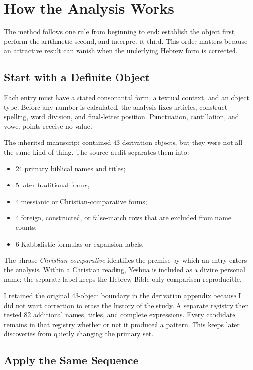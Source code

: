 \section{How the Analysis Works}

The method follows one rule from beginning to end: establish the object first, perform the arithmetic second, and interpret it third. This order matters because an attractive result can vanish when the underlying Hebrew form is corrected.

\subsection{Start with a Definite Object}

Each entry must have a stated consonantal form, a textual context, and an object type. Before any number is calculated, the analysis fixes articles, construct spelling, word division, and final-letter position. Punctuation, cantillation, and vowel points receive no value.

The inherited manuscript contained 43 derivation objects, but they were not all the same kind of thing. The source audit separates them into:

\begin{itemize}
\item 24 primary biblical names and titles;
\item 5 later traditional forms;
\item 4 messianic or Christian-comparative forms;
\item 4 foreign, constructed, or false-match rows that are excluded from name counts;
\item 6 Kabbalistic formulas or expansion labels.
\end{itemize}

The phrase \emph{Christian-comparative} identifies the premise by which an entry enters the analysis. Within a Christian reading, Yeshua is included as a divine personal name; the separate label keeps the Hebrew-Bible-only comparison reproducible.

I retained the original 43-object boundary in the derivation appendix because I did not want correction to erase the history of the study. A separate registry then tested 82 additional names, titles, and complete expressions. Every candidate remains in that registry whether or not it produced a pattern. This keeps later discoveries from quietly changing the primary set.

\subsection{Apply the Same Sequence}

